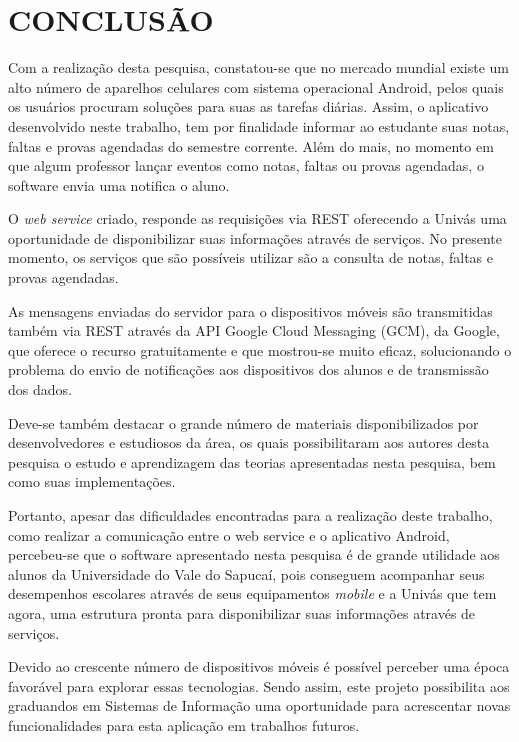 
\chapter{CONCLUSÃO} 

	\par Com a realização desta pesquisa, constatou-se que no mercado mundial
existe um alto número de aparelhos celulares com sistema operacional Android,
pelos quais os usuários procuram soluções para suas as tarefas diárias. Assim, o
aplicativo desenvolvido neste trabalho, tem por finalidade informar ao
estudante suas notas, faltas e provas agendadas do semestre corrente. Além do
mais, no momento em que algum professor lançar eventos como notas, faltas ou
provas agendadas, o software envia uma notifica o aluno.

	\par O \textit{web service} criado, responde as requisições via REST oferecendo
a Univás uma oportunidade de disponibilizar suas informações através de
serviços. No presente momento, os serviços que são possíveis utilizar são a
consulta de notas, faltas e provas agendadas.

	\par As mensagens enviadas do servidor para o dispositivos móveis são
transmitidas também via REST através da API Google Cloud Messaging (GCM), da
Google, que oferece o recurso gratuitamente e que mostrou-se muito eficaz,
solucionando o problema do envio de notificações aos dispositivos dos alunos  e
de transmissão dos dados.

	\par Deve-se também destacar o grande número de materiais disponibilizados por
desenvolvedores e estudiosos da área, os quais possibilitaram aos autores desta
pesquisa o estudo e aprendizagem das teorias apresentadas nesta pesquisa, bem
como suas implementações.

	\par Portanto, apesar das dificuldades encontradas para a realização deste
trabalho, como realizar a comunicação entre o web service e o aplicativo
Android, percebeu-se que o software apresentado nesta pesquisa é de grande
utilidade aos alunos da Universidade do Vale do Sapucaí, pois conseguem
acompanhar seus desempenhos escolares através de seus equipamentos
\textit{mobile} e a Univás que tem agora, uma estrutura pronta para
disponibilizar suas informações através de serviços.

	\par Devido ao crescente número de dispositivos móveis é possível perceber uma
época favorável para explorar essas tecnologias. Sendo assim, este projeto
possibilita aos graduandos em Sistemas de Informação uma oportunidade para
acrescentar novas funcionalidades para esta aplicação em trabalhos futuros.

